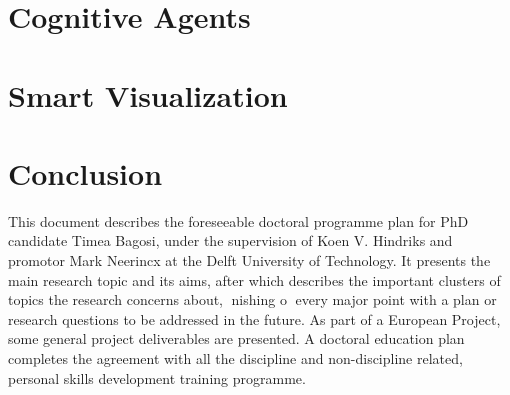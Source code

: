 \chapter{Cognitive Agents}
\chapter{Smart Visualization}
\chapter{Conclusion}
This document describes the foreseeable doctoral programme plan for PhD
candidate Timea Bagosi, under the supervision of Koen V. Hindriks and
promotor Mark Neerincx at the Delft University of Technology. It presents
the main research topic and its aims, after which describes the important
clusters of topics the research concerns about, nishing o every major point
with a plan or research questions to be addressed in the future. As part
of a European Project, some general project deliverables are presented. A
doctoral education plan completes the agreement with all the discipline and
non-discipline related, personal skills development training programme.
    
  
  